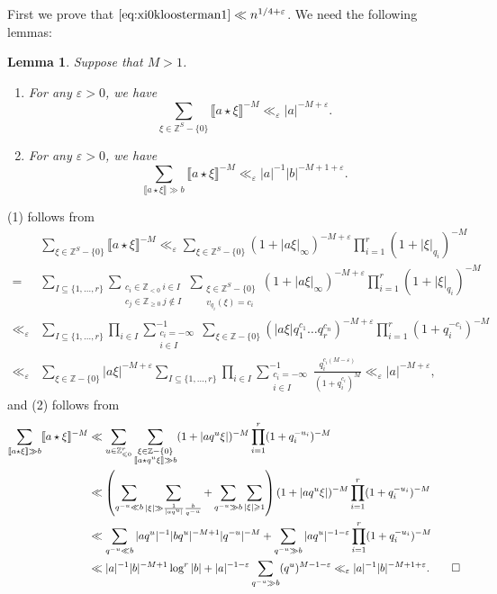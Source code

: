 \documentclass[10pt,oneside,reqno]{amsart}
\makeatletter
\newcommand\ZZ{\mathbb{Z}}
\renewcommand\leq{\leqslant}
\renewcommand\geq{\geqslant}
\theoremstyle{THEOREM}
\newtheorem{lemma}[theorem]{Lemma}
\theoremstyle{DEFINITION}
\theoremstyle{EXERCISE}
\numberwithin{equation}{section}
\renewenvironment{proof}[1][\proofname]{\par
  \vspace{-6pt}
  \pushQED{\qed}
  \normalfont \topsep6\p@\@plus6\p@\relax
  \trivlist
  \item[\hskip\labelsep\rmfamily\bfseries
    #1\@addpunct{:}]\ignorespaces
}{
  \popQED\endtrivlist\@endpefalse
  \vspace{-6pt}
}
\makeatother
\begin{document}
First we prove that $\eqref{eq:xi0kloosterman1}\ll n^{1/4+\varepsilon}$. We need the following lemmas:
\begin{lemma}\label{lem:estimatexilargesum}
Suppose that $M>1$. 
\begin{enumerate}[itemsep=0pt,parsep=0pt,topsep=0pt, leftmargin=0pt,labelsep=2.5pt,itemindent=15pt,label=\upshape{(\arabic*)}]
\item For any $\varepsilon>0$, we have
\[
\sum_{\xi\in \ZZ^S-\{0\}}\llbracket a\star \xi\rrbracket^{-M} \ll_{\varepsilon} |a|^{-M+\varepsilon}.
\]
\item For any $\varepsilon>0$, we have
\[
\sum_{\llbracket a\star\xi\rrbracket\gg b}\llbracket a\star\xi\rrbracket^{-M}\ll_\varepsilon |a|^{-1}|b|^{-M+1+\varepsilon}.
\]
\end{enumerate}
\end{lemma}
\begin{proof}
(1) follows from
\begin{align*}
   &\sum_{\xi\in \ZZ^S-\{0\}}\llbracket a\star \xi\rrbracket^{-M} \ll_\varepsilon  \sum_{\xi\in \ZZ^S-\{0\}}\left(1+|a\xi|_\infty\right)^{-M+\varepsilon}\prod_{i=1}^{r} (1+|\xi|_{q_i})^{-M} \\
   =&\sum_{I\subseteq \{1,\dots,r\}}\sum_{\substack{c_i\in \ZZ_{<0}\ i\in I\\ c_j\in \ZZ_{\geq 0}\ j\notin I}}\sum_{\substack{\xi\in \ZZ^S-\{0\}\\ v_{q_i}(\xi)=c_i}}\left(1+|a\xi|_\infty\right)^{-M+\varepsilon}\prod_{i=1}^{r} (1+|\xi|_{q_i})^{-M}\\
     \ll_\varepsilon &\sum_{I\subseteq \{1,\dots,r\}}\prod_{i\in I}\sum_{\substack{c_i=-\infty\\ i\in I}}^{-1}\sum_{\xi\in \ZZ-\{0\}}(|a\xi| q_1^{c_1}\dots q_r^{c_n})^{-M+\varepsilon}\prod_{i=1}^{r}(1+q_i^{-c_i})^{-M}
     \\
     \ll_\varepsilon &\sum_{\xi\in \ZZ-\{0\}}|a\xi|^{-M+\varepsilon}\sum_{I\subseteq \{1,\dots,r\}}\prod_{i\in I}\sum_{\substack{c_i=-\infty\\ i\in I}}^{-1} \frac{q_i^{c_i(M-\varepsilon)}}{(1+q_i^{c_i})^{M}}\ll_\varepsilon |a|^{-M+\varepsilon},
\end{align*}
and
(2) follows from
\begin{align*}
\sum_{\llbracket a\star\xi\rrbracket\gg b}\llbracket a\star\xi\rrbracket^{-M}&\ll \sum_{u\in \ZZ_{\leq 0}^r}\sum_{\substack{\xi\in \ZZ-\{0\}\\ \llbracket a\star q^u\xi\rrbracket\gg b}}(1+|aq^u\xi|)^{-M}\prod_{i=1}^{r}(1+q_i^{-u_i})^{-M}\\
&\ll \left(\sum_{q^{-u}\ll b}\sum_{|\xi|\gg \frac{1}{|aq^u|}\frac{b}{q^{-u}}}+\sum_{q^{-u}\gg b}\sum_{|\xi|\geq 1}\right)(1+|aq^u\xi|)^{-M}\prod_{i=1}^{r}(1+q_i^{-u_i})^{-M}\\
&\ll  \sum_{q^{-u}\ll b}|aq^u|^{-1}|bq^u|^{-M+1}|q^{-u}|^{-M}+\sum_{q^{-u}\gg b}|aq^u|^{-1-\varepsilon}\prod_{i=1}^{r}(1+q_i^{-u_i})^{-M}\\
&\ll |a|^{-1}|b|^{-M+1}\log^r |b|+|a|^{-1-\varepsilon}\sum_{q^{-u}\gg b}(q^u)^{M-1-\varepsilon}\ll_\varepsilon |a|^{-1}|b|^{-M+1+\varepsilon}.\qedhere
\end{align*}
\end{proof}
\end{document}

